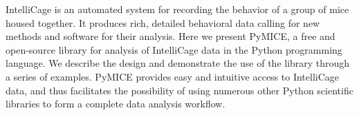 IntelliCage is an automated system for recording the behavior of a group of mice
housed together. It produces rich, detailed behavioral data calling for new
methods and software for their analysis. Here we present PyMICE, a free and open-source
library for analysis of IntelliCage data in the Python programming language.
We describe the design and demonstrate the use of the library through
a series of examples.  PyMICE provides easy and intuitive
access to IntelliCage data, and thus facilitates the possibility of using
numerous other Python scientific libraries to form a complete data analysis workflow.
